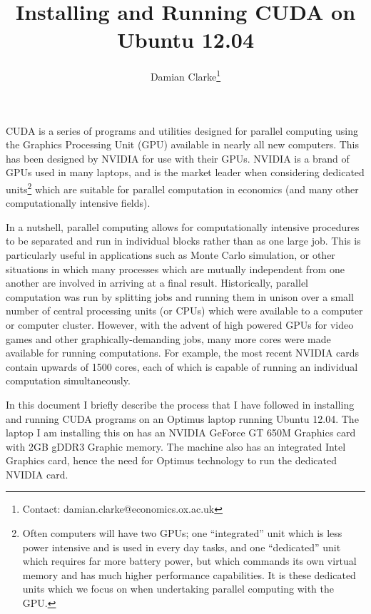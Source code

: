 \documentclass[a4paper,10pt]{article}
\title{Installing and Running CUDA on Ubuntu 12.04}
\author{Damian Clarke\thanks{Contact: damian.clarke@economics.ox.ac.uk}}
\begin{document}
\maketitle

CUDA is a series of programs and utilities designed for parallel computing 
using the Graphics Processing Unit (GPU) available in nearly all new computers.
This has been designed by NVIDIA for use with their GPUs.  NVIDIA is a brand of
GPUs used in many laptops, and is the market leader when considering dedicated 
units\footnote{Often computers will have two GPUs; one ``integrated'' unit 
which is less power intensive and is used in every day tasks, and one 
``dedicated'' unit which requires far more battery power, but which commands
its own virtual memory and has much higher performance capabilities.  It is 
these dedicated units which we focus on when undertaking parallel computing 
with the GPU.} which are suitable for parallel computation in economics (and
many other computationally intensive fields).

In a nutshell, parallel computing allows for computationally intensive 
procedures to be separated and run in individual blocks rather than as one 
large job.  This is particularly useful in applications such as Monte Carlo
simulation, or other situations in which many processes which are mutually
independent from one another are involved in arriving at a final result.  
Historically, parallel computation was run by splitting jobs and running them 
in unison over a small number of central processing units (or CPUs) which were
available to a computer or computer cluster.  However, with the advent of high
powered GPUs for video games and other graphically-demanding jobs, many more 
cores were made available for running computations.  For example, the most 
recent NVIDIA cards contain upwards of 1500 cores, each of which is capable of
running an individual computation simultaneously.

In this document I briefly describe the process that I have followed in 
installing and running CUDA programs on an Optimus laptop running Ubuntu 12.04.
The laptop I am installing this on has an NVIDIA GeForce GT 650M Graphics card 
with 2GB gDDR3 Graphic memory.  The machine also has an integrated Intel 
Graphics card, hence the need for Optimus technology to run the dedicated 
NVIDIA card.
\end{document}
